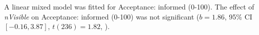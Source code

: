 A linear mixed model was fitted for Acceptance: informed (0-100).
The effect of \textit{nVisible} on Acceptance: informed (0-100) was not significant ($b = 1.86$, 95\% CI $[-0.16, 3.87]$, $t(236) = 1.82$, ).
